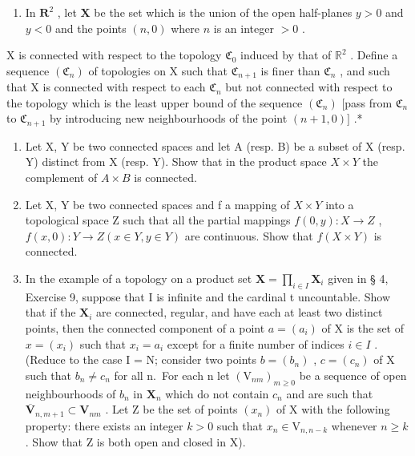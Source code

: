 \begin{enumerate}
\def\labelenumi{\alph{enumi})}
\setcounter{enumi}{1}
\tightlist
\item
  In \(\mathbf{R}^2\) , let \(\mathbf{X}\) be the set which is the union of the open half-planes \(y > 0\) and \(y < 0\) and the points \((n, 0)\) where \(n\) is an integer \(> 0\) .
\end{enumerate}

X is connected with respect to the topology \(\mathfrak{C}_0\) induced by that of \(\mathbb{R}^2\) . Define a sequence \((\mathfrak{C}_n)\) of topologies on X such that \(\mathfrak{C}_{n+1}\) is finer than \(\mathfrak{C}_n\) , and such that X is connected with respect to each \(\mathfrak{C}_n\) but not connected with respect to the topology which is the least upper bound of the sequence \((\mathfrak{C}_n)\) {[}pass from \(\mathfrak{C}_n\) to \(\mathfrak{C}_{n+1}\) by introducing new neighbourhoods of the point \((n+1,0)]\) .*

\begin{enumerate}
\def\labelenumi{\arabic{enumi})}
\setcounter{enumi}{5}
\item
  Let X, Y be two connected spaces and let A (resp. B) be a subset of X (resp. Y) distinct from X (resp. Y). Show that in the product space \(X \times Y\) the complement of \(A \times B\) is connected.
\item
  Let X, Y be two connected spaces and f a mapping of \(X \times Y\) into a topological space Z such that all the partial mappings \(f(0, y) : X \to Z\) , \(f(x, 0) : Y \to Z (x \in Y, y \in Y)\) are continuous. Show that \(f(X \times Y)\) is connected.
\item
  In the example of a topology on a product set \(\mathbf{X} = \prod_{i\in I}\mathbf{X}_i\) given in § 4, Exercise 9, suppose that I is infinite and the cardinal t uncountable. Show that if the \(\mathbf{X}_i\) are connected, regular, and have each at least two distinct points, then the connected component of a point \(a = (a_i)\) of X is the set of \(x = (x_i)\) such that \(x_{i} = a_{i}\) except for a finite number of indices \(i\in I\) . (Reduce to the case I = N; consider two points \(b = (b_n)\) , \(c = (c_n)\) of X such that \(b_{n}\neq c_{n}\) for all n.~For each n let \((\mathrm{V}_{nm})_{m\geqslant 0}\) be a sequence of open neighbourhoods of \(b_{n}\) in \(\mathbf{X}_n\) which do not contain \(c_{n}\) and are such that \(\overline{\mathbf{V}}_{n,m + 1}\subset \mathbf{V}_{nm}\) . Let Z be the set of points \((x_{n})\) of X with the following property: there exists an integer \(k > 0\) such that \(x_{n}\in \mathrm{V}_{n,n - k}\) whenever \(n\geqslant k\) . Show that Z is both open and closed in X).
\end{enumerate}

